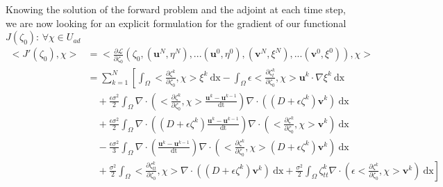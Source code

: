 \documentclass[11pt,a4paper]{article}
\begin{document}
		Knowing the solution of the forward problem and the adjoint at each time step, we are now looking for an explicit formulation for the gradient of our functional $J(\zeta_0)$: $\forall \chi \in U_{ad}$
		\begin{equation*}
			\begin{split}
				<\!J'(\zeta_0),\chi\!> &= <\! \frac{\partial \mathcal{L}}{\partial \zeta_0}(\zeta_0, (\mathbf{u}^N, \eta^N), ... (\mathbf{u}^0, \eta^0), 	(\mathbf{v}^N, \xi^N), ... (\mathbf{v}^0, \xi^0)), \chi\!> \\
				&= \sum^{N}_{k=1} \left[ \int_{\Omega} \! <\!\frac{\partial\zeta^k}{\partial \zeta_0}, \chi\!> \xi^k \: \mathrm{dx} - \int_{\Omega} \! \epsilon <\!\frac{\partial\zeta_t^k}{\partial \zeta_0}, \chi\!> \mathbf{u}^k \cdot \nabla \xi^k \: \mathrm{dx} \right.\\
				& \quad + \frac{\epsilon \sigma^2}{2} \int_{\Omega} \! \nabla \cdot \left( <\!\frac{\partial\zeta^k}{\partial \zeta_0}, \chi\!> \frac{\mathbf{u}^k - \mathbf{u}^{k-1}}{\mathrm{dt}} \right) \nabla \cdot \left( (D + \epsilon \zeta^k) \mathbf{v}^k \right) \: \mathrm{dx} \\
				& \quad + \frac{\epsilon \sigma^2}{2} \int_{\Omega} \! \nabla \cdot \left((D+\epsilon \zeta^k)\frac{\mathbf{u}^k - \mathbf{u}^{k-1}}{\mathrm{dt}}\right) \nabla \cdot \left(<\!\frac{\partial\zeta^k}{\partial \zeta_0}, \chi\!> \mathbf{v}^k \right) \: \mathrm{dx} \\
				&  \quad - \frac{\epsilon \sigma^2}{3} \int_{\Omega} \! \nabla \cdot \left( \frac{\mathbf{u}^k - \mathbf{u}^{k-1}}{\mathrm{dt}} \right) \nabla \cdot \left( <\!\frac{\partial\zeta^k}{\partial \zeta_0}, \chi\!> (D + \epsilon \zeta^k) \mathbf{v}^k \right) \: \mathrm{dx} \\
				& \left. \quad + \frac{\sigma^2}{2}\int_{\Omega} \! <\!\frac{\partial\zeta_{tt}^k}{\partial \zeta_0}, \chi\!> \nabla \cdot \left( (D + \epsilon \zeta^k) \mathbf{v}^k \right) \: \mathrm{dx} + \frac{\sigma^2}{2} \int_{\Omega} \! \zeta_{tt}^k \nabla \cdot \left( \epsilon <\!\frac{\partial\zeta^k}{\partial \zeta_0}, \chi\!> \mathbf{v}^k \right) \: \mathrm{dx} \right]
			\end{split}
		\end{equation*}
		
\end{document}
